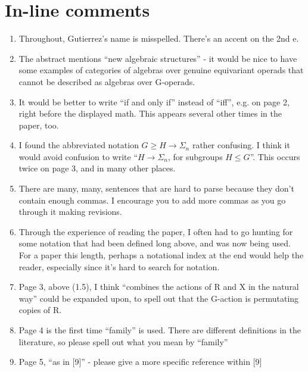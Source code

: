 \documentclass{article}
\begin{document}
\section{In-line comments}

\begin{enumerate}

\item
Throughout, Gutierrez's name is misspelled. There's an accent on the 2nd e.

\item
The abstract mentions ``new algebraic structures'' - it would be nice to have some examples of categories of algebras over genuine equivariant operads that cannot be described as algebras over G-operads.

\item
It would be better to write ``if and only if'' instead of ``iff'', e.g. on page 2, right before the displayed math. This appears several other times in the paper, too.

\item
I found the abbreviated notation $G \geq H \to \Sigma_n$ rather confusing. I think it would avoid confusion to write ``$H\to \Sigma_n$, for subgroups $H \leq G$''. This occurs twice on page 3, and in many other places.

\item
There are many, many, sentences that are hard to parse because they don't contain enough commas. I encourage you to add more commas as you go through it making revisions.

\item
Through the experience of reading the paper, I often had to go hunting for some notation that had been defined long above, and was now being used. For a paper this length, perhaps a notational index at the end would help the reader, especially since it's hard to search for notation.

\item
Page 3, above (1.5), I think ``combines the actions of R and X in the natural way'' could be expanded upon, to spell out that the G-action is permutating copies of R.

\item
Page 4 is the first time ``family'' is used. There are different definitions in the literature, so please spell out what you mean by ``family''

\item
Page 5, ``as in [9]'' - please give a more specific reference within [9]


\end{enumerate}
\end{document}
